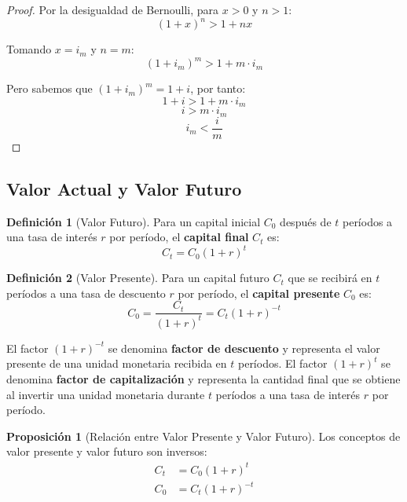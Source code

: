 \documentclass[12pt,a4paper]{article}
\theoremstyle{definition}
\newtheorem{definicion}{Definición}[section]
\newtheorem{proposicion}{Proposición}[section]
\begin{document}
\begin{proof}
Por la desigualdad de Bernoulli, para $x > 0$ y $n > 1$:
$$(1 + x)^n > 1 + nx$$

Tomando $x = i_m$ y $n = m$:
$$(1 + i_m)^m > 1 + m \cdot i_m$$

Pero sabemos que $(1 + i_m)^m = 1 + i$, por tanto:
$$1 + i > 1 + m \cdot i_m$$
$$i > m \cdot i_m$$
$$i_m < \frac{i}{m}$$
\end{proof}

\subsection{Valor Actual y Valor Futuro}

\begin{definicion}[Valor Futuro]
Para un capital inicial $C_0$ después de $t$ períodos a una tasa de interés $r$ por período, el \textbf{capital final} $C_t$ es:
\begin{equation}
C_t = C_0(1 + r)^t
\end{equation}
\end{definicion}

\begin{definicion}[Valor Presente]
Para un capital futuro $C_t$ que se recibirá en $t$ períodos a una tasa de descuento $r$ por período, el \textbf{capital presente} $C_0$ es:
\begin{equation}
C_0 = \frac{C_t}{(1 + r)^t} = C_t(1 + r)^{-t}
\end{equation}
\end{definicion}

El factor $(1 + r)^{-t}$ se denomina \textbf{factor de descuento} y representa el valor presente de una unidad monetaria recibida en $t$ períodos. El factor $(1 + r)^t$ se denomina \textbf{factor de capitalización} y representa la cantidad final que se obtiene al invertir una unidad monetaria durante $t$ períodos a una tasa de interés $r$ por período.

\begin{proposicion}[Relación entre Valor Presente y Valor Futuro]
Los conceptos de valor presente y valor futuro son inversos:
\begin{align}
C_t &= C_0(1 + r)^t \\
C_0 &= C_t(1 + r)^{-t}
\end{align}
\end{proposicion}

\begin{center}
    
\end{center}
\end{document}
